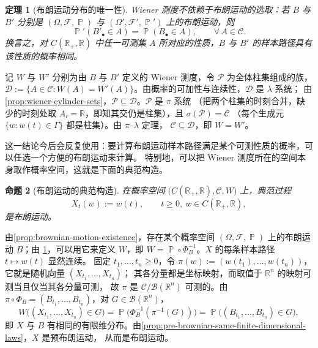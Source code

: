 \documentclass[UTF8,11pt,a4paper,oneside,fontset=fandol]{ctexrep}
\makeatletter
\numberwithin{equation}{section}
\theoremstyle{zhthm}
\newtheorem{theorem}{定理}[section]
\newtheorem{proposition}[theorem]{命题}
\renewenvironment{proof}[1][\proofname]{\par
  \pushQED{\qed}%
  \normalfont\topsep6\p@\@plus6\p@\relax
  \trivlist
  \item[\hskip\labelsep\bfseries#1\hspace{0.5em}]\ignorespaces
}{%
  \popQED\endtrivlist\@endpefalse
}
\renewcommand{\proofname}{证明}
\newcommand{\R}{\mathbb{R}}
\newcommand{\B}{\mathcal{B}}
\newcommand{\F}{\mathcal{F}}
\DeclareMathOperator{\Prob}{\mathbb{P}}
\makeatother
\begin{document}
\begin{theorem}[布朗运动分布的唯一性]
\label{thm:wiener-measure-uniqueness}
Wiener 测度不依赖于布朗运动的选取：若 $B$ 与 $B'$ 分别是 $(\Omega,\F,\Prob)$ 与 $(\Omega',\F',\Prob')$ 上的布朗运动，则
\[
  \Prob'(B'_\bullet\in A)=\Prob(B_\bullet\in A),\qquad\forall\,A\in\mathscr C.
\]
换言之，对 $C(\R_+,\R)$ 中任一可测集 $A$ 所对应的性质，$B$ 与 $B'$ 的样本路径具有该性质的概率相同。
\end{theorem}

\begin{proof}
记 $W$ 与 $W'$ 分别为由 $B$ 与 $B'$ 定义的 Wiener 测度，令 $\mathcal P$ 为全体柱集组成的族，
$\mathcal D:=\{A\in\mathscr C:W(A)=W'(A)\}$。由概率的可加性与连续性，$\mathcal D$ 是 $\lambda$ 系统；
由\cref{prop:wiener-cylinder-sets}，$\mathcal P\subseteq\mathcal D$。$\mathcal P$ 是 $\pi$ 系统
（把两个柱集的时刻合并，缺少的时刻处取 $A_i=\R$，即知其交仍是柱集），且 $\sigma(\mathcal P)=\mathscr C$
（每个生成元 $\{w:w(t)\in\Gamma\}$ 都是柱集）。由 $\pi$--$\lambda$ 定理\cite[定理 2.1.6，第 46 页]{Durrett2019}，
$\mathscr C\subseteq\mathcal D$，即 $W=W'$。
\end{proof}

这一结论今后会反复使用：要计算布朗运动样本路径满足某个可测性质的概率，可以任选一个方便的布朗运动来计算。
特别地，可以把 Wiener 测度所在的空间本身取作概率空间，这就是下面的典范构造。

\begin{proposition}[布朗运动的典范构造]
\label{prop:canonical-brownian-motion}
在概率空间 $\bigl(C(\R_+,\R),\mathscr C,W\bigr)$ 上，典范过程
\[
  X_t(w):=w(t),\qquad t\ge0,\ w\in C(\R_+,\R),
\]
是布朗运动。
\end{proposition}

\begin{proof}
由\cref{prop:brownian-motion-existence}，存在某个概率空间 $(\Omega,\F,\Prob)$ 上的布朗运动 $B$；由%
\cref{thm:wiener-measure-uniqueness}，可以用它来定义 $W$，即 $W=\Prob\circ\Phi_B^{-1}$。$X$ 的每条样本路径 $t\mapsto w(t)$ 显然连续。
固定 $t_1,\ldots,t_n\ge0$，令 $\pi(w):=(w(t_1),\ldots,w(t_n))$，它就是随机向量 $(X_{t_1},\ldots,X_{t_n})$；
其各分量都是坐标映射，而取值于 $\R^n$ 的映射可测当且仅当其各分量可测\cite[\S1.3]{Durrett2019}，
故 $\pi$ 是 $\mathscr C/\B(\R^n)$ 可测的。由 $\pi\circ\Phi_B=(B_{t_1},\ldots,B_{t_n})$，对 $G\in\B(\R^n)$，
\[
  W\bigl((X_{t_1},\ldots,X_{t_n})\in G\bigr)=\Prob\bigl(\Phi_B^{-1}(\pi^{-1}(G))\bigr)=\Prob\bigl((B_{t_1},\ldots,B_{t_n})\in G\bigr),
\]
即 $X$ 与 $B$ 有相同的有限维分布。由\cref{prop:pre-brownian-same-finite-dimensional-laws}，$X$ 是预布朗运动，
从而是布朗运动。
\end{proof}
\end{document}

